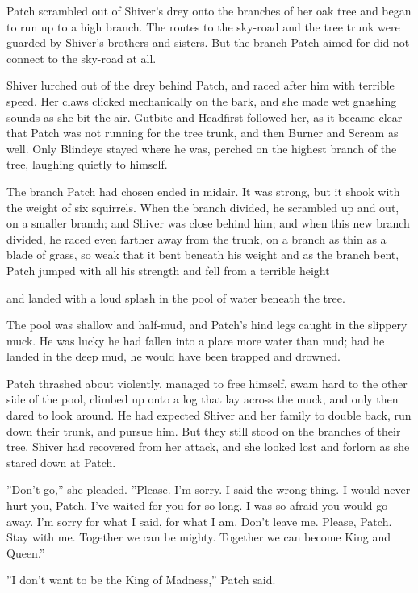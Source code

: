 \documentclass[12pt]{book}
\begin{document}
 Patch scrambled out of Shiver's drey onto the branches of her oak tree and began to run up to a high branch. The routes to the sky-road and the tree trunk were guarded by Shiver's brothers and sisters. But the branch Patch aimed for did not connect to the sky-road at all.\par
 Shiver lurched out of the drey behind Patch, and raced after him with terrible speed. Her claws clicked mechanically on the bark, and she made wet gnashing sounds as she bit the air. Gutbite and Headfirst followed her, as it became clear that Patch was not running for the tree trunk, and then Burner and Scream as well. Only Blindeye stayed where he was, perched on the highest branch of the tree, laughing quietly to himself.\par
 The branch Patch had chosen ended in midair. It was strong, but it shook with the weight of six squirrels. When the branch divided, he scrambled up and out, on a smaller branch; and Shiver was close behind him; and when this new branch divided, he raced even farther away from the trunk, on a branch as thin as a blade of grass, so weak that it bent beneath his weight %
 and as the branch bent, Patch jumped with all his strength %
 and fell from a terrible height %
\par
 and landed with a loud splash in the pool of water beneath the tree.\par
 The pool was shallow and half-mud, and Patch's hind legs caught in the slippery muck. He was lucky he had fallen into a place more water than mud; had he landed in the deep mud, he would have been trapped and drowned.\par
Patch thrashed about violently, managed to free himself, swam hard to the other side of the pool, climbed up onto a log that lay across the muck, and only then dared to look around. He had expected Shiver and her family to double back, run down their trunk, and pursue him. But they still stood on the branches of their tree. Shiver had recovered from her attack, and she looked lost and forlorn as she stared down at Patch.\par
 ''Don't go,'' she pleaded. ''Please. I'm sorry. I said the wrong thing. I would never hurt you, Patch. I've waited for you for so long. I was so afraid you would go away. I'm sorry for what I said, for what I am. Don't leave me. Please, Patch. Stay with me. Together we can be mighty. Together we can become King and Queen.''\par
 ''I don't want to be the King of Madness,'' Patch said.\par
\end{document}
